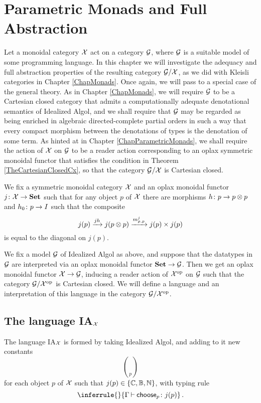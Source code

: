 \documentclass{report}[11pt]
\begin{document}
\chapter{Parametric Monads and Full Abstraction}

Let a monoidal category $\mathcal X$ act on a category $\mathcal G$, where $\mathcal G$ is a suitable model of some programming language.  
In this chapter we will investigate the adequacy and full abstraction properties of the resulting category $\mathcal G/\mathcal X$, as we did with Kleisli categories in Chapter \ref{ChapMonads}.  
Once again, we will pass to a special case of the general theory.  
As in Chapter \ref{ChapMonads}, we will require $\mathcal G$ to be a Cartesian closed category that admits a computationally adequate denotational semantics of Idealized Algol, and we shall require that $\mathcal G$ may be regarded as being enriched in algebraic directed-complete partial orders in such a way that every compact morphism between the denotations of types is the denotation of some term.
As hinted at in Chapter \ref{ChapParametricMonads}, we shall require the action of $\mathcal X$ on $\mathcal G$ to be a reader action corresponding to an oplax symmetric monoidal functor that satisfies the condition in Theorem \ref{TheCartesianClosedCx}, so that the category $\mathcal G/\mathcal X$ is Cartesian closed.

We fix a symmetric monoidal category $\mathcal X$ and an oplax monoidal functor $j\colon \mathcal X \to {\normalfont\textbf{Set}}$ such that for any object $p$ of $\mathcal X$ there are morphisms $h\colon p \to p \otimes p$ and $h_0 \colon p \to I$ such that the composite
\[
  j(p) \xrightarrow{jh} j(p\otimes p) \xrightarrow{m^j_{p,p}} j(p) \times j(p)
  \]
is equal to the diagonal on $j(p)$.

We fix a model $\mathcal G$ of Idealized Algol as above, and suppose that the datatypes in $\mathcal G$ are interpreted via an oplax monoidal functor ${\normalfont\textbf{Set}} \to \mathcal G$.  
Then we get an oplax monoidal functor $\mathcal X \to \mathcal G$, inducing a reader action of $\mathcal X^{\mathrm{op}}$ on $\mathcal G$ such that the category $\mathcal G/\mathcal X^{\mathrm{op}}$ is Cartesian closed.  
We will define a language and an interpretation of this language in the category $\mathcal G/\mathcal X^{\mathrm{op}}$.

\newcommand{\IAX}{{IA${}_{X}$}\xspace}
\newcommand{\IAXX}{{IA${}_{\X}$}\xspace}
\section{The language \IAXX}

\begin{definition}[{The language \IAXX}]
  The language \IAXX is formed by taking Idealized Algol, and adding to it new constants
  \[
    \choose_p
    \]
  for each object $p$ of $\mathcal X$ such that $j(p)\in\{\mathbb{C},\mathbb{B},\mathbb{N}\}$, with typing rule
  \[
    \inferrule{ }{\Gamma \ts \choose_p \from j(p)}\,.
    \]
\end{definition}
\end{document}
